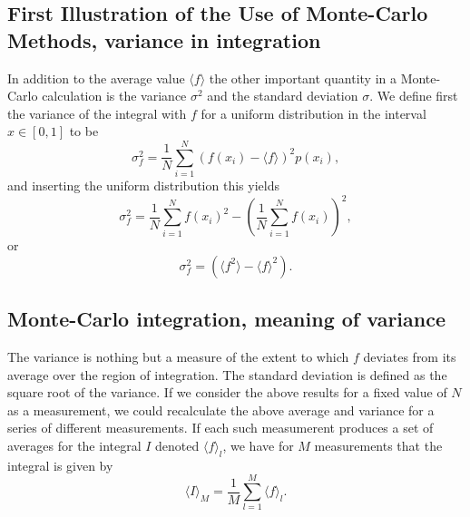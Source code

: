 \documentclass[%
oneside,                 %
final,                   %
10pt]{article}
\newenvironment{block_mdfboxadmon}[1][]{
\begin{block_mdfboxmdframed}[frametitle=#1]
}
{
\end{block_mdfboxmdframed}
}
\begin{document}
\subsection{First Illustration of the Use of Monte-Carlo Methods, variance in integration}

\begin{block_mdfboxadmon}[]
In addition to the average value $\langle f \rangle$ the other 
important quantity in a  
Monte-Carlo calculation is the variance $\sigma^2$ and 
the standard deviation $\sigma$. We define first the variance
of the integral with $f$ for a uniform distribution in the interval 
$x \in [0,1]$ to be
\begin{equation*}
  \sigma^2_f=\frac{1}{N}\sum_{i=1}^N(f(x_i)-\langle f\rangle)^2p(x_i), 
\end{equation*}
and inserting the uniform distribution this yields
\begin{equation*}
  \sigma^2_f=\frac{1}{N}\sum_{i=1}^Nf(x_i)^2- 
  \left(\frac{1}{N}\sum_{i=1}^Nf(x_i)\right)^2,
\end{equation*}
or
\begin{equation*}
  \sigma^2_f=\left(\langle f^2\rangle - 
                                 \langle f \rangle^2\right).
\end{equation*}
\end{block_mdfboxadmon} %



\subsection{Monte-Carlo integration, meaning of variance}

\begin{block_mdfboxadmon}[]
The variance  is nothing but a measure of the extent to
which $f$ deviates from its average over the region of integration. 
The standard deviation is defined as the square root of the variance.
If we consider the above results for 
a fixed value of $N$ as a measurement, 
we could recalculate the 
above average and variance for a series of different measurements.
If each such measumerent produces a set of averages for the 
integral $I$ denoted $\langle f\rangle_l$, we have for $M$ measurements
that the integral is given by
\begin{equation*}
   \langle I \rangle_M=\frac{1}{M}\sum_{l=1}^{M}\langle f\rangle_l.
\end{equation*}
\end{block_mdfboxadmon} %
\end{document}

